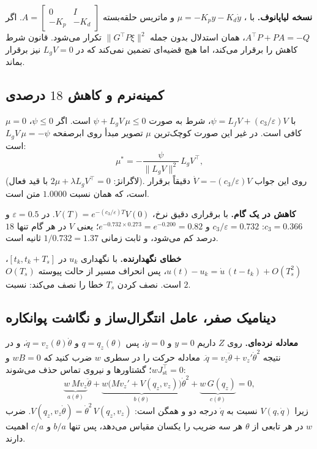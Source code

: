 \documentclass[10pt,twocolumn]{article}
\newcommand{\en}[1]{\lr{#1}}
\begin{document}
\textbf{نسخه لیاپانوف.} با \en{PD}، $\mu=-K_py-K_d\dot y$ و ماتریس حلقه‌بسته
$A=\begin{bmatrix}0&I\\-K_p&-K_d\end{bmatrix}$. اگر $A^{\top}P+PA=-Q$، همان استدلال بدون جمله
$\|G^{\top}P\xi\|^2$ تکرار می‌شود. قانون \en{PD} شرط کاهش را برقرار می‌کند، اما هیچ قضیه‌ای
تضمین نمی‌کند که در $L_gV=0$ نیز برقرار بماند.

\subsection{\en{CLF-QP} کمینه‌نرم و کاهش $18$ درصدی}
با $\psi=L_fV+(c_3/\varepsilon)V$، شرط به صورت
$\psi+L_gV\,\mu\le0$ است. اگر $\psi\le0$، $\mu=0$ کافی است. در غیر این صورت کوچک‌ترین
$\mu$ تصویر مبدأ روی ابرصفحه $L_gV\,\mu=-\psi$ است:
\begin{equation*}
    \mu^*=-\frac{\psi}{\|L_gV\|^2}\,L_gV^{\top},
\end{equation*}
(لاگرانژ: $2\mu+\lambda L_gV^{\top}=0$ با قید فعال). روی این جواب
$\dot V=-(c_3/\varepsilon)V$ دقیقاً برقرار است، که همان نسبت $1.0000$ متن است.

\textbf{کاهش در یک گام.} با برقراری دقیق نرخ،
$V(T)=e^{-(c_3/\varepsilon)T}V(0)$. در $\varepsilon=0.5$ و $c_3=0.366$:
$c_3/\varepsilon=0.732$ و $e^{-0.732\times0.273}=e^{-0.200}=0.82$؛ یعنی $V$ در هر گام تنها
$18$ درصد کم می‌شود، و ثابت زمانی $1/0.732=1.37$ ثانیه است.

\textbf{خطای نگهدارنده.} با نگهداری $u_k$ در $[t_k,t_k+T_s]$،
$u(t)-u_k=\dot u\,(t-t_k)+O(T_s^2)$، پس انحراف مسیر از حالت پیوسته $O(T_s)$ است. نصف کردن
$T_s$ خطا را نصف می‌کند: نسبت $2$.

\subsection{دینامیک صفر، عامل انتگرال‌ساز و نگاشت پوانکاره}
\textbf{معادله نرده‌ای.} روی $Z$ داریم $y=0$ و $\dot y=0$، پس $q=q_z(\theta)$ و
$\dot q=v_z(\theta)\dot\theta$، و در نتیجه
$\ddot q=v_z\ddot\theta+v_z'\dot\theta^2$. معادله حرکت را در سطری $w$ ضرب کنید که
$wB=0$ و $wJ_{\mathrm{st}}^{\top}=0$؛ گشتاورها و نیروی تماس حذف می‌شوند:
\begin{equation*}
    \underbrace{w\,M v_z}_{a(\theta)}\ddot\theta
    +\underbrace{w\big(M v_z'+V(q_z,v_z)\big)}_{b(\theta)}\dot\theta^2
    +\underbrace{w\,G(q_z)}_{c(\theta)}=0 ,
\end{equation*}
زیرا $V(q,\dot q)$ نسبت به $\dot q$ درجه دو و همگن است:
$V(q_z,v_z\dot\theta)=\dot\theta^2\,V(q_z,v_z)$. ضرب $w$ در هر تابعی از $\theta$ هر سه ضریب را
یکسان مقیاس می‌دهد، پس تنها $b/a$ و $c/a$ اهمیت دارند.
\end{document}
